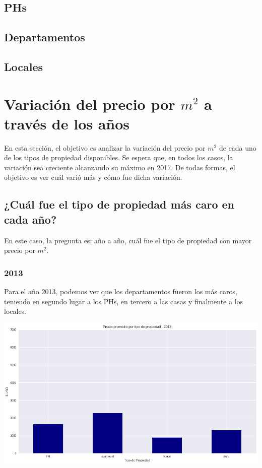 \documentclass[a4paper, 10pt]{article}
\begin{document}
			\subsection{PHs}
			\subsection{Departamentos}
			\subsection{Locales}
		
		
		\section{Variación del precio por $m^2$ a través de los años}
			En esta sección, el objetivo es analizar la variación del precio por $m^2$ de cada uno de los tipos de propiedad
			disponibles. Se espera que, en todos los casos, la variación sea creciente alcanzando su máximo en 2017. De todas formas,
			el objetivo es ver cuál varió más y cómo fue dicha variación.
			\subsection{¿Cuál fue el tipo de propiedad más caro en cada año?}
				En este caso, la pregunta es: año a año, cuál fue el tipo de propiedad con mayor precio por $m^2$.
				\subsubsection{2013}
					Para el año 2013, podemos ver que los departamentos fueron los más caros, teniendo en segundo lugar a los
					PHs, en tercero a las casas y finalmente a los locales.
					\begin{center}
   		    				\includegraphics[width=\textwidth]{images/propPrice2013}
				  	\end{center}
\end{document}
